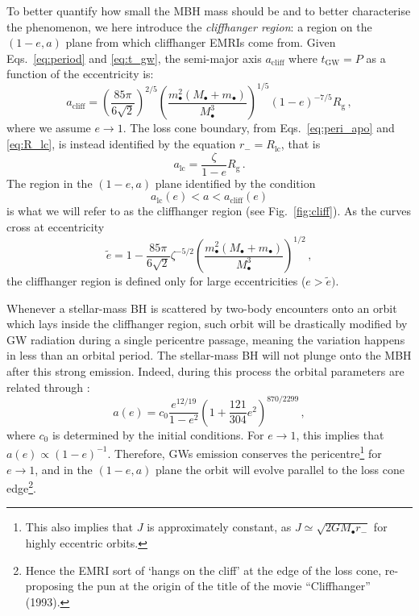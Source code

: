 \documentclass[desactivate]{aa}
\begin{document}
        To better quantify how small the MBH mass should be and to better characterise the phenomenon, we here introduce the \textit{cliffhanger region}: a region on the $(1-e,a)$ plane from which cliffhanger EMRIs come from. Given Eqs.\ \eqref{eq:period} and \eqref{eq:t_gw}, the semi-major axis $a_\mathrm{cliff}$ where $t_\mathrm{GW} = P$ as a function of the eccentricity is:
        \begin{equation} \label{eq:a_cliff}
            a_\mathrm{cliff} = \left( \frac{85 \pi}{6 \sqrt{2}} \right)^{2/5} \left( \frac{m_\bullet^2 (M_\bullet + m_\bullet)}{M_\bullet^3} \right)^{1/5} (1-e)^{-7/5} R_\mathrm{g} \, ,
        \end{equation}
        where we assume $e \to 1$. The loss cone boundary, from Eqs.\ \eqref{eq:peri_apo} and \eqref{eq:R_lc}, is instead identified by the equation $r_-=R_\mathrm{lc}$, that is
        \begin{equation} \label{eq:losscone_edge}
            a_\mathrm{lc} = \frac{\zeta}{1-e} R_\mathrm{g} \, .
        \end{equation}
        The region in the $(1-e,a)$ plane identified by the condition
        \begin{equation}
            a_\mathrm{lc} (e) < a < a_\mathrm{cliff} (e)
        \end{equation}
        is what we will refer to as the cliffhanger region (see Fig.\ \ref{fig:cliff}). As the curves cross at eccentricity
        \begin{equation}
            \tilde{e} = 1 - \frac{85 \pi}{6 \sqrt{2}} \zeta^{-5/2} \left( \frac{m_\bullet^2 (M_\bullet + m_\bullet)}{M_\bullet^3} \right)^{1/2} \, ,
        \end{equation}
        the cliffhanger region is defined only for large eccentricities ($e>\tilde{e})$.
        
        Whenever a stellar-mass BH is scattered by two-body encounters onto an orbit which lays inside the cliffhanger region, such orbit will be drastically modified by GW radiation during a single pericentre passage, meaning the variation happens in less than an orbital period.
        The stellar-mass BH will not plunge onto the MBH after this strong emission. Indeed, during this process the orbital parameters are related through \citep{1964PhRv..136.1224P}:
        \begin{equation} \label{eq:a(e)}
            a(e) = c_0 \frac{e^{12/19}}{1-e^2} \left( 1 + \frac{121}{304} e^2 \right)^{870/2299} \, ,
        \end{equation}
        where $c_0$ is determined by the initial conditions. For $e \to 1$, this implies that $a(e) \propto (1-e)^{-1}$. Therefore, GWs emission conserves the pericentre\footnote{This also implies that $J$ is approximately constant, as $J \simeq \sqrt{2GM_\bullet r_-}$ for highly eccentric orbits.} for $e \to 1$, and in the $(1-e,a)$ plane the orbit will evolve parallel to the loss cone edge\footnote{Hence the EMRI sort of `hangs on the cliff' at the edge of the loss cone, re-proposing the pun at the origin of the title of the movie ``Cliffhanger'' (1993).}.
\end{document}
